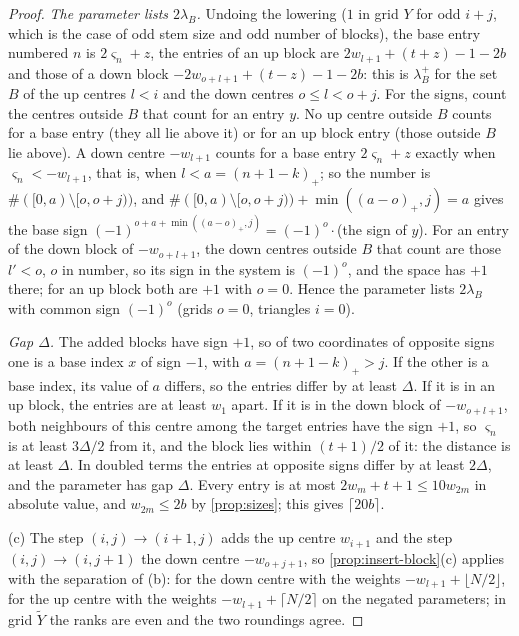 \begin{proof}
\emph{The parameter lists $2\lambda_B$.} Undoing the lowering ($1$ in grid $Y$ for odd $i+j$, which is the case of odd stem size and odd number of blocks), the base entry numbered $n$ is $2\varsigma_n+z$, the entries of an up block are $2w_{l+1}+(t+z)-1-2b$ and those of a down block $-2w_{o+l+1}+(t-z)-1-2b$: this is $\lambda^+_B$ for the set $B$ of
the up centres $l<i$ and the down centres $o\le l<o+j$. For the signs, count the centres outside $B$ that count for an entry $y$. No up centre outside $B$ counts for a base entry (they all lie above it) or for an up block entry (those outside $B$ lie above). A down centre $-w_{l+1}$ counts for a base entry $2\varsigma_n+z$ exactly when
$\varsigma_n<-w_{l+1}$, that is, when $l<a=(n+1-k)_+$; so the number is $\#([0,a)\setminus[o,o+j))$, and $\#([0,a)\setminus[o,o+j))+\min((a-o)_+,j)=a$ gives the base sign $(-1)^{o+a+\min((a-o)_+,j)}=(-1)^o\cdot$(the sign of $y$). For an entry of the down block of $-w_{o+l+1}$, the down centres outside $B$ that count are those $l'<o$,
$o$ in number, so its sign in the system is $(-1)^o$, and the space has $+1$ there; for an up block both are $+1$ with $o=0$. Hence the parameter lists $2\lambda_B$ with common sign $(-1)^o$ (grids $o=0$, triangles $i=0$).

\emph{Gap $\Delta$.} The added blocks have sign $+1$, so of two coordinates of opposite signs one is a base index $x$ of sign $-1$, with $a=(n+1-k)_+>j$. If the other is a base index, its value of $a$ differs, so the entries differ by at least $\Delta$. If it is in an up block, the entries are at least $w_1$ apart. If it is in the down block of
$-w_{o+l+1}$, both neighbours of this centre among the target entries have the sign $+1$, so $\varsigma_n$ is at least $3\Delta/2$ from it, and the block lies within $(t+1)/2$ of it: the distance is at least $\Delta$. In doubled terms the entries at opposite signs differ by at least $2\Delta$, and the parameter has gap $\Delta$.
Every entry is at most $2w_m+t+1\le10w_{2m}$ in absolute value, and $w_{2m}\le2b$ by \cref{prop:sizes}; this gives $\lceil20b\rceil$.

(c) The step $(i,j)\to(i+1,j)$ adds the up centre $w_{i+1}$ and the step $(i,j)\to(i,j+1)$ the down centre $-w_{o+j+1}$, so \cref{prop:insert-block}(c) applies with the separation of (b): for the down centre with the weights $-w_{l+1}+\lfloor N/2\rfloor$, for the up centre with the weights $-w_{l+1}+\lceil N/2\rceil$ on the negated
parameters; in grid $\tilde Y$ the ranks are even and the two roundings agree.


\end{proof}
